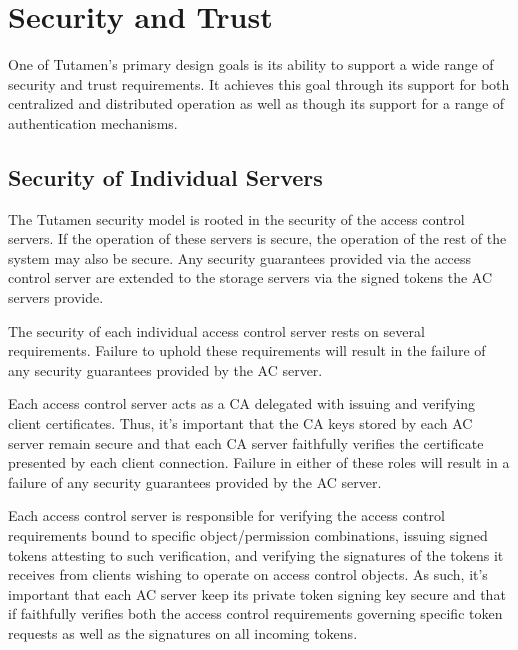 \section{Security and Trust}
\label{sec:trust}

One of Tutamen's primary design goals is its ability to support a wide
range of security and trust requirements. It achieves this goal
through its support for both centralized and distributed operation as
well as though its support for a range of authentication mechanisms.

\subsection{Security of Individual Servers}

The Tutamen security model is rooted in the security of the access
control servers. If the operation of these servers is secure, the
operation of the rest of the system may also be secure. Any security
guarantees provided via the access control server are extended to the
storage servers via the signed tokens the AC servers provide.

The security of each individual access control server rests on several
requirements. Failure to uphold these requirements will result in the
failure of any security guarantees provided by the AC server.

\begin{packed_desc}
\item[Certificate Authority Role:] Each access control server acts as
  a CA delegated with issuing and verifying client certificates. Thus,
  it's important that the CA keys stored by each AC server remain
  secure and that each CA server faithfully verifies the certificate
  presented by each client connection. Failure in either of these
  roles will result in a failure of any security guarantees provided
  by the AC server.
\item[Token Issuance and Verification:] Each access control server is
  responsible for verifying the access control requirements bound to
  specific object/permission combinations, issuing signed tokens
  attesting to such verification, and verifying the signatures of the
  tokens it receives from clients wishing to operate on access control
  objects. As such, it's important that each AC server keep its
  private token signing key secure and that if faithfully verifies
  both the access control requirements governing specific token
  requests as well as the signatures on all incoming tokens.
\end{packed_desc}


